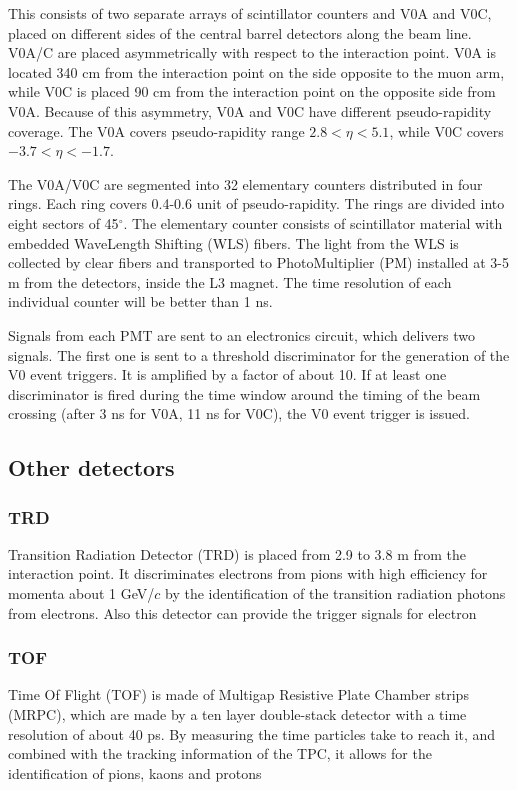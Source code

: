 This consists of two separate arrays of scintillator counters and V0A and V0C, placed on different sides of the central barrel detectors along the beam line. V0A/C are placed asymmetrically with respect to the interaction point. V0A is located 340 cm from the interaction point on the side opposite to the muon arm, while V0C is placed 90 cm from the interaction point on the opposite side from V0A. Because of this asymmetry, V0A and V0C have different pseudo-rapidity coverage. The V0A covers pseudo-rapidity range $2.8 < \eta < 5.1$, while V0C covers $-3.7 < \eta < -1.7$.

The V0A/V0C are segmented into 32 elementary counters distributed in four rings. Each ring covers 0.4-0.6 unit of pseudo-rapidity. The rings are divided into eight sectors of 45$^{\circ}$. The elementary counter consists of scintillator material with embedded WaveLength Shifting (WLS) fibers. The light from the WLS is collected by clear fibers and transported to PhotoMultiplier (PM) installed at 3-5 m from the detectors, inside the L3 magnet. The time resolution of each individual counter will be better than 1 ns.

Signals from each PMT are sent to an electronics circuit, which delivers two signals. The first one is sent to a threshold discriminator for the generation of the V0 event triggers. It is amplified by a factor of about 10. If at least one discriminator is fired during the time window around the timing of the beam crossing (after 3 ns for V0A, 11 ns for V0C), the V0 event trigger is issued.

\subsection{Other detectors}

\subsubsection{TRD}
Transition Radiation Detector (TRD) \cite{Cortese:519145} is placed from 2.9 to 3.8 m from the interaction point. It discriminates electrons from pions with high efficiency for momenta about 1 GeV/$c$ by the identification of the transition radiation photons from electrons. Also this detector can provide the trigger signals for electron 

\subsubsection{TOF}
Time Of Flight (TOF) \cite{alici2013mrpc} is made of Multigap Resistive Plate Chamber strips (MRPC), which are made by a ten layer double-stack detector with a time resolution of about 40 ps. By measuring the time particles take to reach it, and combined with the tracking information of the TPC, it allows for the identification of pions, kaons and protons

